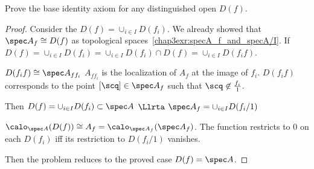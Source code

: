\begin{exr}
Prove the base identity axiom for any distinguished open $D(f)$. 
\end{exr}
\begin{proof}
Consider the $D(f)=\cup_{i\in I}D(f_i)$. We already showed that $\spec A_f\cong D(f)$ as topological spaces~\ref{chap3exr:specA_f_and_specA/I}. If $D(f)=\cup_{i\in I}D(f_i)=\cup_{i\in I}D(f_i)\cap D(f)=\cup_{i\in I}D(f_if)$.

$D(f_i f)\cong\spec A_{ff_i}$ $A_{ff_i}$ is the localization of $A_f$ at the image of $f_i$. $D(f_i f)$ corresponds to the point $[\scq]\in \spec A_f$ such that $\scq\not\in \frac{f_i}{1}$.

Then $D(f)=\cup_{i\in I}D(f_i)\subset \spec A$ $\Llrta$ $\spec A_f=\cup_{i\in I} D(f_i/1)$

$\calo_{\spec A}(D(f))\cong A_f=\calo_{\spec A_f}(\spec A_f)$. The function restricts to $0$ on each $D(f_i)$ iff its restriction to $D(f_i/1)$ vanishes.

Then the problem reduces to the proved case $D(f)=\spec A$.
\end{proof}

